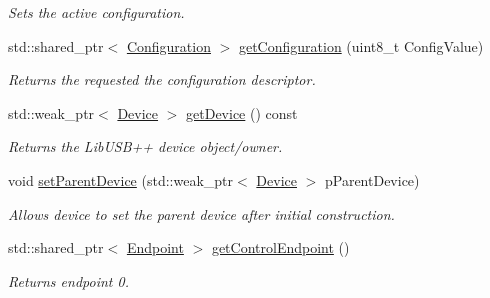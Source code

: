 \begin{DoxyCompactItemize}
\begin{DoxyCompactList}\small\item\em Sets the active configuration. \end{DoxyCompactList}\item 
\hypertarget{class_lib_u_s_b_1_1_device_impl_aab2f41857ad040c218e845c8ad08d420}{std\-::shared\-\_\-ptr$<$ \hyperlink{class_lib_u_s_b_1_1_configuration}{Configuration} $>$ \hyperlink{class_lib_u_s_b_1_1_device_impl_aab2f41857ad040c218e845c8ad08d420}{get\-Configuration} (uint8\-\_\-t Config\-Value)}\label{class_lib_u_s_b_1_1_device_impl_aab2f41857ad040c218e845c8ad08d420}

\begin{DoxyCompactList}\small\item\em Returns the requested the configuration descriptor. \end{DoxyCompactList}\item 
\hypertarget{class_lib_u_s_b_1_1_device_impl_a0968082ea56c3f4e393f75255a6ee463}{std\-::weak\-\_\-ptr$<$ \hyperlink{class_lib_u_s_b_1_1_device}{Device} $>$ \hyperlink{class_lib_u_s_b_1_1_device_impl_a0968082ea56c3f4e393f75255a6ee463}{get\-Device} () const }\label{class_lib_u_s_b_1_1_device_impl_a0968082ea56c3f4e393f75255a6ee463}

\begin{DoxyCompactList}\small\item\em Returns the Lib\-U\-S\-B++ device object/owner. \end{DoxyCompactList}\item 
\hypertarget{class_lib_u_s_b_1_1_device_impl_a1dfb67b1c9f691beb15d0f0f7c19b8a5}{void \hyperlink{class_lib_u_s_b_1_1_device_impl_a1dfb67b1c9f691beb15d0f0f7c19b8a5}{set\-Parent\-Device} (std\-::weak\-\_\-ptr$<$ \hyperlink{class_lib_u_s_b_1_1_device}{Device} $>$ p\-Parent\-Device)}\label{class_lib_u_s_b_1_1_device_impl_a1dfb67b1c9f691beb15d0f0f7c19b8a5}

\begin{DoxyCompactList}\small\item\em Allows device to set the parent device after initial construction. \end{DoxyCompactList}\item 
\hypertarget{class_lib_u_s_b_1_1_device_impl_ada72c87f33e85138eb0b4155b46050ac}{std\-::shared\-\_\-ptr$<$ \hyperlink{class_lib_u_s_b_1_1_endpoint}{Endpoint} $>$ \hyperlink{class_lib_u_s_b_1_1_device_impl_ada72c87f33e85138eb0b4155b46050ac}{get\-Control\-Endpoint} ()}\label{class_lib_u_s_b_1_1_device_impl_ada72c87f33e85138eb0b4155b46050ac}

\begin{DoxyCompactList}\small\item\em Returns endpoint 0. \end{DoxyCompactList}\end{DoxyCompactItemize}
